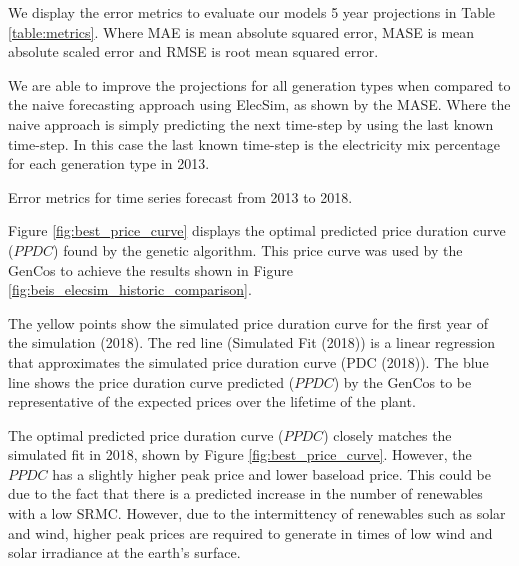 We display the error metrics to evaluate our models 5 year projections in Table \ref{table:metrics}. Where MAE is mean absolute squared error, MASE is mean absolute scaled error and RMSE is root mean squared error.

We are able to improve the projections for all generation types when compared to the naive forecasting approach using ElecSim, as shown by the MASE. Where the naive approach is simply predicting the next time-step by using the last known time-step. In this case the last known time-step is the electricity mix percentage for each generation type in 2013. 

\begin{table}[htb]
	\centering
	\caption{Error metrics for time series forecast from 2013 to 2018.}
	\label{table:metrics}
\end{table}

Figure \ref{fig:best_price_curve} displays the optimal predicted price duration curve ($PPDC$) found by the genetic algorithm. This price curve was used by the GenCos to achieve the results shown in Figure \ref{fig:beis_elecsim_historic_comparison}. 

The yellow points show the simulated price duration curve for the first year of the simulation (2018). The red line (Simulated Fit (2018)) is a linear regression that approximates the simulated price duration curve (PDC (2018)). The blue line shows the price duration curve predicted ($PPDC$) by the GenCos to be representative of the expected prices over the lifetime of the plant.


The optimal predicted price duration curve ($PPDC$) closely matches the simulated fit in 2018, shown by Figure \ref{fig:best_price_curve}. However, the $PPDC$ has a slightly higher peak price and lower baseload price. This could be due to the fact that there is a predicted increase in the number of renewables with a low SRMC. However, due to the intermittency of renewables such as solar and wind, higher peak prices are required to generate in times of low wind and solar irradiance at the earth's surface.



